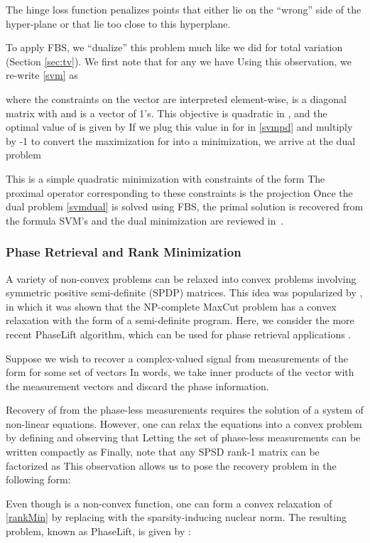 \documentclass{amsart}
\newcommand{\half}{\frac{1}{2}}
\newcommand{\eqn}[2]{}
\newcommand{\aln}[1]{}
\newcommand{\st}{\hbox{ \,\,subject to\,\, }}
\newcommand{\mcA}{\mathcal{A}}
\DeclareMathOperator*{\minimize}{minimize\quad}
\theoremstyle{definition}
\begin{document}
 
 The hinge loss function penalizes points that either lie on the ``wrong'' side of the hyper-plane  or that lie too close to this hyperplane.
  
  To apply FBS, we ``dualize'' this problem much like we did for total variation (Section \ref{sec:tv}).  We first note that for any  we have 
   Using this observation, we re-write \eqref{svm} as
  \eqn{svmpd}{\min_{w} \max_{0\le x\le C}   \half \|w\|^2 + x^T(1_n- LDw))=\max_{0\le x\le C}   \min_{w}  \half \|w\|^2 + x^T(1_n- LDw))}
  where the constraints on the vector  are interpreted element-wise,  is a diagonal matrix with  and  is a vector of 1's.  This objective is quadratic in , and the optimal value of  is given by   If we plug this value in for  in \eqref{svmpd} and multiply by -1 to convert the maximization for  into a minimization, we arrive at the dual problem
     \eqn{svmdual}{\minimize_{0\le x\le C} \half \|D^TLx\|^2- \sum_i x_i.}
     This is a simple quadratic minimization with constraints of the form  The proximal operator corresponding to these constraints is the projection  Once the dual problem \eqref{svmdual} is solved using FBS, the primal solution is recovered from the formula   SVM's and the dual minimization are reviewed in~\cite{SS04}.
      


 


\subsubsection{Phase Retrieval and Rank Minimization} \label{phase}
A variety of non-convex problems can be relaxed into convex problems involving symmetric positive semi-definite (SPDP) matrices.  
This  idea was popularized by \cite{GW95}, in which it was shown that the NP-complete MaxCut problem has a convex relaxation with the form of a  semi-definite program. Here, we consider the more recent PhaseLift algorithm, which can be used for phase retrieval applications \cite{CSV13}.

Suppose we wish to recover a complex-valued signal  from measurements of the form  for some set of vectors   In words, we take inner products of the vector  with the measurement vectors  and discard the phase information.

Recovery of  from the phase-less measurements  requires the solution of a system of non-linear equations.  However, one can relax the equations into a convex problem by defining  and observing that   Letting  the set of phase-less measurements  can be  written compactly as    Finally, note that any SPSD rank-1 matrix  can be factorized as   This observation allows us to pose the recovery problem in the following form:
         \aln{\label{rankMin}
          \minimize \!\!\!\!\mathrm{rank}(X) \st  \!\! \mcA(X) = b, \, X\succeq 0.
          }
Even though  is a non-convex function, one can form a  convex relaxation of \eqref{rankMin} by replacing  with the sparsity-inducing nuclear norm.  The resulting problem, known as PhaseLift, is given by \cite{CSV13}:
      \aln{\label{rankMinrelaxed}
        \minimize\!\!\!\!\! \|X\|_*  \st  \!\! \mcA(X) = b, \, X\succeq 0.
          }
         
\end{document}
